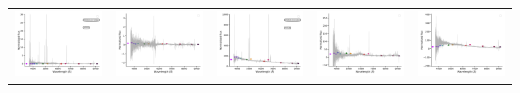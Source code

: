 \begin{center}
\begin{longtable}{l l l l l }
    \includegraphics[width=0.19\linewidth, clip]{Figs/Figs-lamost/spec-57688-EG215014S003621M01_sp06-082-STRIPE82-0127-009047.pdf} & \includegraphics[width=0.19\linewidth, clip]{Figs/Figs-lamost/spec-57688-EG215014S003621M01_sp07-238-SPLUS-s03s04-030944.pdf} & \includegraphics[width=0.19\linewidth, clip]{Figs/Figs-lamost/spec-57688-EG215014S003621M01_sp12-086-STRIPE82-0128-050321.pdf} & \includegraphics[width=0.19\linewidth, clip]{Figs/Figs-lamost/spec-57688-EG215014S003621M01_sp13-066-STRIPE82-0129-031160.pdf} & \includegraphics[width=0.19\linewidth, clip]{Figs/Figs-lamost/spec-57688-EG215014S003621M01_sp13-120-STRIPE82-0130-010305.pdf} \\

\end{longtable}
\end{center}
